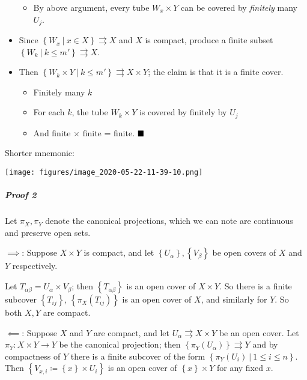 \begin{solution}
\begin{itemize}
  \begin{itemize}
  \tightlist
  \item
    By above argument, every tube \(W_x \times Y\) can be covered by
    \emph{finitely} many \(U_j\).
  \end{itemize}
\item
  Since
  \(\left\{{W_x{~\mathrel{\Big|}~}x\in X}\right\}\rightrightarrows X\)
  and \(X\) is compact, produce a finite subset
  \(\left\{{W_k {~\mathrel{\Big|}~}k\leq m'}\right\} \rightrightarrows X\).
\item
  Then
  \(\left\{{W_k\times Y{~\mathrel{\Big|}~}k\leq m'}\right\} \rightrightarrows X\times Y\);
  the claim is that it is a finite cover.

  \begin{itemize}
  \tightlist
  \item
    Finitely many \(k\)
  \item
    For each \(k\), the tube \(W_k \times Y\) is covered by finitely by
    \(U_j\)
  \item
    And finite \(\times\) finite = finite. \(\hfill\blacksquare\)
  \end{itemize}
\end{itemize}

Shorter mnemonic:

\texttt{[image: figures/image\_2020-05-22-11-39-10.png]}

\hypertarget{proof-2}{%
\subparagraph{Proof 2}\label{proof-2}}

Let \(\pi_X, \pi_Y\) denote the canonical projections, which we can note
are continuous and preserve open sets.

\(\implies\): Suppose \(X\times Y\) is compact, and let
\(\left\{{U_\alpha}\right\}, \left\{{V_\beta}\right\}\) be open covers
of \(X\) and \(Y\) respectively.

Let \(T_{\alpha\beta} = U_\alpha \times V_\beta\); then
\(\left\{{T_{\alpha\beta}}\right\}\) is an open cover of \(X\times Y\).
So there is a finite subcover \(\left\{{T_{ij}}\right\}\),
\(\left\{{\pi_X(T_{ij})}\right\}\) is an open cover of \(X\), and
similarly for \(Y\). So both \(X,Y\) are compact.

\(\impliedby\): Suppose \(X\) and \(Y\) are compact, and let
\(U_\alpha \rightrightarrows X\times Y\) be an open cover. Let
\(\pi_Y: X\times Y \to Y\) be the canonical projection; then
\(\left\{{\pi_Y(U_\alpha)}\right\}\rightrightarrows Y\) and by
compactness of \(Y\) there is a finite subcover of the form
\(\left\{{\pi_Y(U_i) {~\mathrel{\Big|}~}1\leq i \leq n}\right\}\). Then
\(\left\{{V_{x, i} \coloneqq\left\{{x}\right\} \times U_i}\right\}\) is
an open cover of \(\left\{{x}\right\} \times Y\) for any fixed \(x\).


\end{solution}
